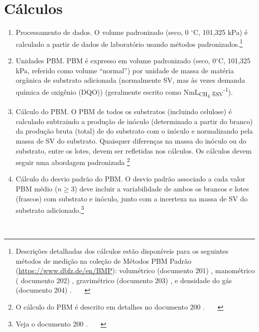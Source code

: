 \documentclass[]{article}
\begin{document}
\section{Cálculos}
\label{sec:calculations}
\begin{enumerate}
  \item Processamento de dados. 
        O volume  padronizado (seco, 0 $^\circ$C, 101,325 kPa) é calculado a partir de dados de laboratório usando métodos padronizados.\footnote{
          Descrições detalhadas dos cálculos estão disponíveis para os seguintes métodos de medição na coleção de Métodos PBM Padrão (\url{https://www.dbfz.de/en/BMP}): volumétrico (documento 201) \citep{BMPdoc201vol}, manométrico ( documento 202) \citep{BMPdoc202man}, gravimétrico (documento 203) \citep{BMPdoc203grav}, e densidade do gás (documento 204) \citep{BMPdoc204gasdens}.
        }
  \item Unidades PBM.
        PBM é expresso em volume  padronizado (seco, 0$^\circ$C, 101,325 kPa, referido como volume ``normal'') por unidade de massa de matéria orgânica de substrato adicionada (normalmente SV, mas às vezes demanda química de oxigênio (DQO)) (geralmente escrito como NmL\textsubscript{CH\textsubscript{4}} g\textsubscript{SV}\textsuperscript{-1}).
  \item Cálculo do PBM.
        O PBM de todos os substratos (incluindo celulose) é calculado subtraindo a produção de inóculo  (determinado a partir do branco) da produção bruta (total) de  do substrato com o inóculo e normalizando pela massa de SV do substrato.
        Quaisquer diferenças na massa do inóculo ou do substrato, entre os lotes, devem ser refletidas nos cálculos.
        Os cálculos devem seguir uma abordagem padronizada \footnote{
        O cálculo do PBM é descrito em detalhes no documento 200 \citep{BMPdoc200BMP}.
    }
  \item Cálculo do desvio padrão do PBM.
        O desvio padrão associado a cada valor PBM médio ($n \ge 3$) deve incluir a variabilidade de ambos os brancos e lotes (frascos) com substrato e inóculo, junto com a incerteza na massa de SV do substrato adicionado.\footnote{
          Veja o documento 200 \citep{BMPdoc200BMP}. 
        }
\end{enumerate}
 
\end{document}
